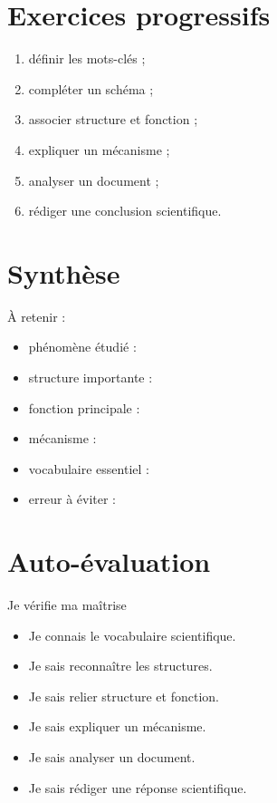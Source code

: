 \documentclass[11pt,a4paper]{article}
\begin{document}
\section{Exercices progressifs}

\begin{cadreactivite}
\begin{enumerate}
    \item définir les mots-clés ;
    \item compléter un schéma ;
    \item associer structure et fonction ;
    \item expliquer un mécanisme ;
    \item analyser un document ;
    \item rédiger une conclusion scientifique.
\end{enumerate}
\end{cadreactivite}

\section{Synthèse}

\begin{cadresynthese}
À retenir :

\begin{itemize}
    \item phénomène étudié : \dotfill
    \item structure importante : \dotfill
    \item fonction principale : \dotfill
    \item mécanisme : \dotfill
    \item vocabulaire essentiel : \dotfill
    \item erreur à éviter : \dotfill
\end{itemize}
\end{cadresynthese}

\section{Auto-évaluation}

\begin{cadregris}{Je vérifie ma maîtrise}
\begin{itemize}
    \item[$\square$] Je connais le vocabulaire scientifique.
    \item[$\square$] Je sais reconnaître les structures.
    \item[$\square$] Je sais relier structure et fonction.
    \item[$\square$] Je sais expliquer un mécanisme.
    \item[$\square$] Je sais analyser un document.
    \item[$\square$] Je sais rédiger une réponse scientifique.
\end{itemize}
\end{cadregris}
\end{document}
